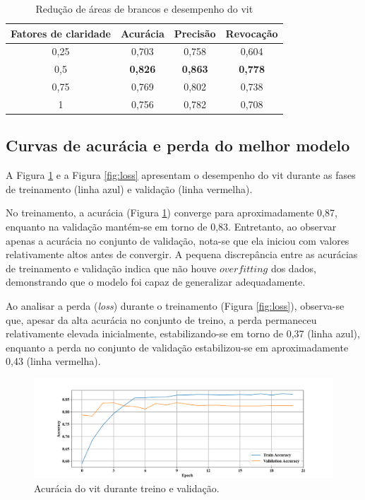 \begin{table}[tb]
\caption{\label{tab:brightnessfactor} Redução de áreas de brancos e desempenho do \acrshort{vit}}
\begin{center}
\begin{tabular}{c|ccc}
\toprule
 Fatores de claridade & Acurácia &  Precisão  & Revocação \\
\midrule
     0,25 & 0,703 & 0,758 & 0,604 \\
     0,5 & \textbf{0,826} & \textbf{0,863} & \textbf{0,778} \\
     0,75 & 0,769 & 0,802 & 0,738 \\
     1 & 0,756 & 0,782 & 0,708 \\
\bottomrule
\end{tabular}
\end{center}
\end{table}

\subsection{Curvas de acurácia e perda do melhor modelo}
A Figura \ref{fig:acc} e a Figura \ref{fig:loss} apresentam o desempenho do \acrshort{vit} durante as fases de treinamento (linha azul) e validação (linha vermelha).

No treinamento, a acurácia (Figura \ref{fig:acc}) converge para aproximadamente 0,87, enquanto na validação mantém-se em torno de 0,83.
Entretanto, ao observar apenas a acurácia no conjunto de validação, nota-se que ela iniciou com valores relativamente altos antes de convergir.
A pequena discrepância entre as acurácias de treinamento e validação indica que não houve $overfitting$ dos dados, demonstrando que o modelo foi capaz de generalizar adequadamente.

Ao analisar a perda (\textit{loss}) durante o treinamento (Figura \ref{fig:loss}), observa-se que, apesar da alta acurácia no conjunto de treino, a perda permaneceu relativamente elevada inicialmente, estabilizando-se em torno de 0,37 (linha azul), enquanto a perda no conjunto de validação estabilizou-se em aproximadamente 0,43 (linha vermelha).

\begin{figure}[tb]
\centerline{\includegraphics[width=1\linewidth]{images/resultados/sgd_accuracy.png}}
\caption{Acurácia do \acrshort{vit} durante treino e validação.}
\label{fig:acc}
\end{figure}

